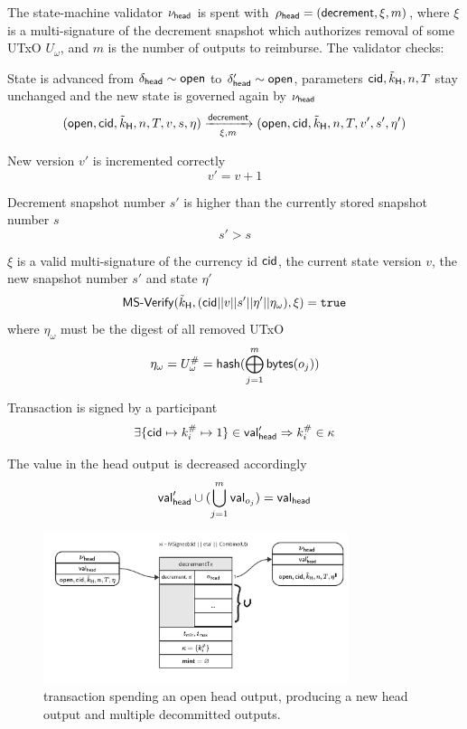 \noindent The state-machine validator $\nu_\mathsf{head}$ is spent with
$\rho_{\mathsf{head}} = (\mathsf{decrement}, \xi, m)$, where $\xi$ is a multi-signature of
the decrement snapshot which authorizes removal of some UTxO $U_\omega$, and $m$ is
the number of outputs to reimburse. The validator checks:
\begin{menumerate}
	\item State is advanced from $\delta_{\mathsf{head}} \sim \mathsf{open}$ to
	$\delta_{\mathsf{head}}' \sim \mathsf{open}$, parameters $\mathsf{cid},\tilde{k}_{\mathsf{H}},n,T$ stay
	unchanged and the new state is governed again by $\nu_\mathsf{head}$
	\[
		(\mathsf{open},\mathsf{cid},\tilde{k}_{\mathsf{H}},n,T,v,s,\eta) \xrightarrow[\xi, m]{\mathsf{decrement}} (\mathsf{open},\mathsf{cid},\tilde{k}_{\mathsf{H}},n,T,v',s',\eta')
	\]
	\item New version $v'$ is incremented correctly
	\[
		v' = v + 1
	\]
	\item Decrement snapshot number $s'$ is higher than the currently stored snapshot number $s$
	\[
		s' > s
	\]
	\item $\xi$ is a valid multi-signature of the currency id $\mathsf{cid}$, the current state version $v$, the new snapshot number $s'$ and state $\eta'$
	\[
		\mathsf{MS\textsf{-}{}Verify}(\tilde{k}_{\mathsf{H}},(\mathsf{cid} || v || s' || \eta' || \eta_{\omega}),\xi) = \mathtt{true}
	\]
	where $\eta_{\omega}$ must be the digest of all removed UTxO
	\[
		\eta_{\omega} = U^{\#}_{\omega}  = \mathsf{hash}(\bigoplus_{j=1}^{m} \mathsf{bytes}(o_{j}))
	\]
	\item Transaction is signed by a participant
	\[
		\exists \{\mathsf{cid} \mapsto k^{\#}_{i} \mapsto 1\} \in \mathsf{val}_{\mathsf{head}}' \Rightarrow k^{\#}_{i} \in \kappa
	\]
	\item The value in the head output is decreased accordingly
	\[
		\mathsf{val}_{\mathsf{head}}' \cup (\bigcup_{j=1}^{m} \mathsf{val}_{o_{j}}) = \mathsf{val}_{\mathsf{head}}
	\]
\end{menumerate}

\begin{figure}
	\centering
	\includegraphics[width=0.8\textwidth]{figures/decrementTx.pdf}
	\caption{\mtxDecrement{} transaction spending an open head output,
		producing a new head output and multiple decommitted outputs.}\label{fig:decrementTx}
\end{figure}

